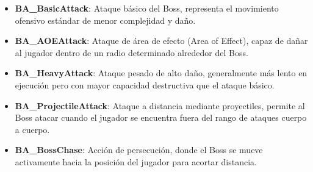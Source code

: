 \documentclass[informe]{upropuesta}
\begin{document}
\begin{itemize}
\item \textbf{BA\_BasicAttack}: Ataque básico del Boss, representa el movimiento ofensivo estándar de menor complejidad y daño.
\item \textbf{BA\_AOEAttack}: Ataque de área de efecto (Area of Effect), capaz de dañar al jugador dentro de un radio determinado alrededor del Boss.

\item \textbf{BA\_HeavyAttack}: Ataque pesado de alto daño, generalmente más lento en ejecución pero con mayor capacidad destructiva que el ataque básico.

\item \textbf{BA\_ProjectileAttack}: Ataque a distancia mediante proyectiles, permite al Boss atacar cuando el jugador se encuentra fuera del rango de ataques cuerpo a cuerpo.

\item \textbf{BA\_BossChase}: Acción de persecución, donde el Boss se mueve activamente hacia la posición del jugador para acortar distancia.

\end{itemize}






















































\end{document}
